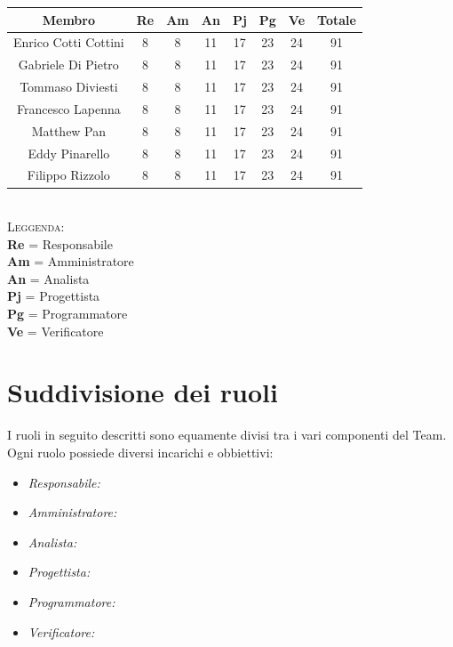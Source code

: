 \documentclass{article}
\begin{document}
\begin{table}[!h]
	\begin{center}
		\begin{tabular}{ |c|c|c|c|c|c|c|c| }
			\hline
			\textbf{Membro}    & \textbf{Re} & \textbf{Am} & \textbf{An} & \textbf{Pj} & \textbf{Pg} & \textbf{Ve} & \textbf{Totale} \\
			\hline
			Enrico Cotti Cottini     & 8           & 8           & 11          & 17          & 23          & 24          & 91              \\
			Gabriele Di Pietro       & 8           & 8           & 11          & 17          & 23          & 24          & 91              \\
			Tommaso Diviesti         & 8           & 8           & 11          & 17          & 23          & 24          & 91              \\
			Francesco Lapenna        & 8           & 8           & 11          & 17          & 23          & 24          & 91              \\
			Matthew Pan              & 8           & 8           & 11          & 17          & 23          & 24          & 91              \\
			Eddy Pinarello           & 8           & 8           & 11          & 17          & 23          & 24          & 91              \\
			Filippo Rizzolo          & 8           & 8           & 11          & 17          & 23          & 24          & 91              \\
			\hline
		\end{tabular}
	\end{center}
\end{table}
\\
\textsc{Leggenda:} \\
    \textbf{Re} = Responsabile \\
    \textbf{Am} = Amministratore \\
    \textbf{An} = Analista \\
    \textbf{Pj} = Progettista \\
    \textbf{Pg} = Programmatore \\
    \textbf{Ve} = Verificatore \\
    
\newpage
\section{Suddivisione dei ruoli}
I ruoli in seguito descritti sono equamente divisi tra i vari componenti del Team. Ogni ruolo possiede diversi incarichi e obbiettivi:
\begin{itemize}
    \item \textit{Responsabile:} 
    \item \textit{Amministratore:} 
    \item \textit{Analista:} 
    \item \textit{Progettista:} 
    \item \textit{Programmatore:} 
    \item \textit{Verificatore:} 
\end{itemize}
\end{document}
